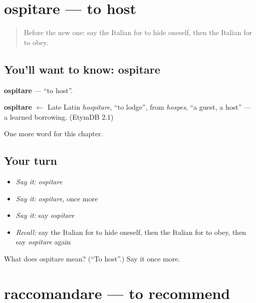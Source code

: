 \section[ospitare]{ospitare — to host}

\label{lesson:IT-C213-ospitare}



\begin{quote}
Before the new one: say the Italian for to hide oneself, then the Italian for to obey.
\end{quote}

\subsection*{You'll want to know: ospitare}
\textbf{ospitare} — \textquotedblleft{}to host\textquotedblright{}.

\begin{cousinweb}
\textbf{ospitare} $\leftarrow$ Late Latin \emph{hospitare}, \textquotedblleft{}to lodge\textquotedblright{}, from \emph{hospes}, \textquotedblleft{}a guest, a host\textquotedblright{} — a learned borrowing. (EtymDB 2.1)
\end{cousinweb}

\begin{grammarlens}[title={What you've built}]
One more word for this chapter.
\end{grammarlens}

\subsection*{Your turn}
\begin{itemize}
\raggedright
  \item \emph{Say it:} \emph{ospitare}
  \item \emph{Say it:} \emph{ospitare}, once more
  \item \emph{Say it:} say \emph{ospitare}
  \item \emph{Recall:} say the Italian for to hide oneself, then the Italian for to obey, then say \emph{ospitare} again
\end{itemize}

\begin{tcolorbox}[breakable,colback=teal!4,colframe=teal!35!black,title={Before you move on}]
What does ospitare mean? (\textquotedblleft{}To host\textquotedblright{}.) Say it once more.
\end{tcolorbox}
\section[raccomandare]{raccomandare — to recommend}

